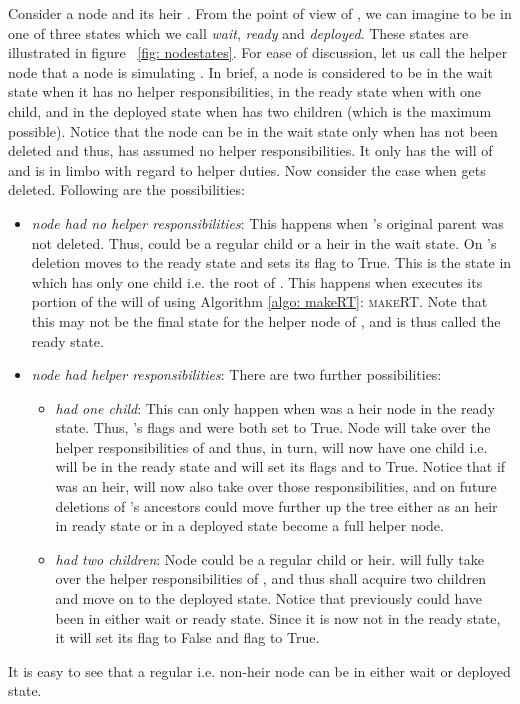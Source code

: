 \documentclass[11pt]{article}
\begin{document}
 Consider a node  and its heir . From the point of view of , we
can imagine   to be in one of three states which we  call \emph{wait}, \emph{ready} and \emph{deployed}. These states
are illustrated in figure ~\ref{fig: nodestates}. For ease of discussion, let us call the helper node that a node is simulating
.
In brief, a node is considered to be in the wait state when it has no helper
responsibilities, in the ready state when   with one child, and in the deployed state when  
 has  two children (which is the maximum possible).  Notice that the node can  be in the wait state only when   has
not been deleted and thus,  has assumed no helper responsibilities. It only has the will of  and is in limbo
with regard to helper duties. Now consider the case when  gets deleted.  Following are the possibilities:
\begin{itemize}
\item \emph{node  had no helper responsibilities}: This happens when 's original parent was not deleted. Thus,
  could be a regular child or a heir in the wait state. On 's deletion  moves to the ready state and sets its
flag  to True. This is the state in which   has only one child i.e.
the root of . This happens when  executes its portion of the will of  using Algorithm \ref{algo: makeRT}:
\textsc{makeRT}. Note that this may not be the final state for the helper node of , and is thus called the ready
state.
\item \emph{node  had helper responsibilities}: There are two further possibilities:
\begin{itemize}
\item \emph{ had one child}: This can only happen when  was a heir node  in the ready state. Thus,
's flags  and  were both set to True. Node 
will take over the helper responsibilities of  and thus, in turn,  will now have one child i.e. will be in the
ready state and will set its flags  and  to True. Notice that if  was an heir,  will
now also take over those responsibilities, and on future deletions of 's ancestors could move further up the tree
either as an heir in ready state or in a deployed state become a full helper node.
\item \emph{ had two children}: Node  could be a regular child or heir.  will fully take over the
helper responsibilities of , and thus  shall acquire two children and move on to the deployed state.
Notice that previously  could have been in either  wait or  ready state. Since  it is now not in the ready
state, it will set its  flag to False and  flag to True.
\end{itemize}
\end{itemize}
 It is easy to see that a regular i.e. non-heir node can be in either wait or deployed state.\\
 
\end{document}
